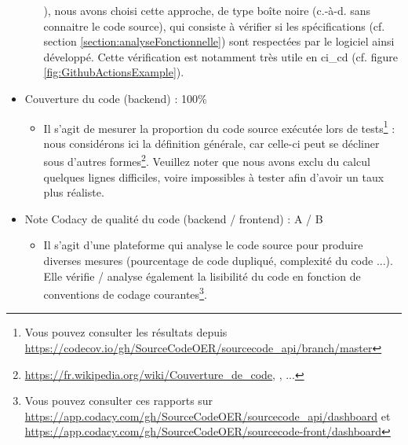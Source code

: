 \begin{itemize}[nosep,noitemsep,topsep=0pt,partopsep=0pt,after=\vspace*{2pt}]
\begin{itemize}[nosep,noitemsep,topsep=0pt,partopsep=0pt,after=\vspace*{2pt}]
{        }), nous avons choisi cette approche, de type boîte noire (c.-à-d. sans connaitre le code source), qui consiste à vérifier si les spécifications (cf. section \ref{section:analyseFonctionnelle}) sont respectées par le logiciel ainsi développé.
        Cette vérification est notamment très utile en \gls{ci_cd} (cf. figure \ref{fig:GithubActionsExample}).
    \end{itemize}
    \item Couverture du code (\gls{backend}) :  100\%
    \begin{itemize}[nosep,noitemsep,topsep=0pt,partopsep=0pt,after=\vspace*{2pt}]
        \item Il s'agit de mesurer la proportion du code source exécutée lors de tests\footnote{
            Vous pouvez consulter les résultats depuis \href{https://codecov.io/gh/SourceCodeOER/sourcecode\_api/branch/master}{https://codecov.io/gh/SourceCodeOER/sourcecode\_api/branch/master}
        } : nous considérons ici la définition générale, car celle-ci peut se décliner sous d'autres formes\footnote{
            \href{https://fr.wikipedia.org/wiki/Couverture\_de\_code}{https://fr.wikipedia.org/wiki/Couverture\_de\_code}, \cite{concept_cfg}, ...
        }.
        Veuillez noter que nous avons exclu du calcul quelques lignes difficiles, voire impossibles à tester afin d'avoir un taux plus réaliste.
    \end{itemize}
    \item Note Codacy de qualité du code (\gls{backend} / \gls{frontend}) :  A / B
    \begin{itemize}[nosep,noitemsep,topsep=0pt,partopsep=0pt,after=\vspace*{2pt}]
        \item Il s'agit d'une plateforme qui analyse le code source pour produire diverses mesures (pourcentage de code dupliqué, complexité du code ...).
        Elle vérifie / analyse également la lisibilité du code en fonction de conventions de codage courantes\footnote{
            Vous pouvez consulter ces rapports sur \href{https://app.codacy.com/gh/SourceCodeOER/sourcecode\_api/dashboard}{https://app.codacy.com/gh/SourceCodeOER/sourcecode\_api/dashboard} et
            \href{https://app.codacy.com/gh/SourceCodeOER/sourcecode-front/dashboard}{https://app.codacy.com/gh/SourceCodeOER/sourcecode-front/dashboard}
        }.
    \end{itemize}       
\end{itemize}

